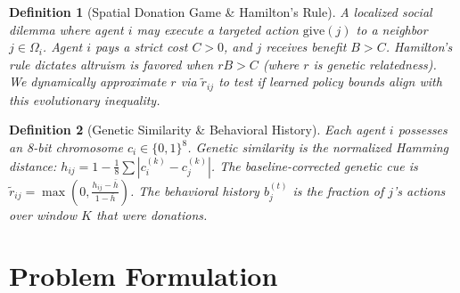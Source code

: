 \documentclass{article}
\newtheorem{definition}{Definition}
\begin{document}
\begin{table}[!htbp]
\centering
\caption{Table of Mathematical Notation}
\label{tab:notation}
\end{table}

\begin{definition}[Spatial Donation Game \& Hamilton's Rule]
A localized social dilemma where agent $i$ may execute a targeted action $\text{give}(j)$ to a neighbor $j \in \Omega_i$. Agent $i$ pays a strict cost $C > 0$, and $j$ receives benefit $B > C$. Hamilton's rule dictates altruism is favored when $rB > C$ (where $r$ is genetic relatedness). We dynamically approximate $r$ via $\tilde{r}_{ij}$ to test if learned policy bounds align with this evolutionary inequality.
\end{definition}

\begin{definition}[Genetic Similarity \& Behavioral History]
Each agent $i$ possesses an 8-bit chromosome $c_i \in \{0, 1\}^8$. Genetic similarity is the normalized Hamming distance: $h_{ij} = 1 - \frac{1}{8} \sum |c_i^{(k)} - c_j^{(k)}|$. The baseline-corrected genetic cue is $\tilde{r}_{ij} = \max(0, \frac{h_{ij} - \bar{h}}{1 - \bar{h}})$. The behavioral history $b_j^{(t)}$ is the fraction of $j$'s actions over window $K$ that were donations.
\end{definition}

\section{Problem Formulation}
\end{document}

